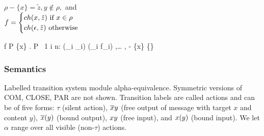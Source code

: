 \begin{minipage}{0.9\textwidth}
    {\judgement{}{}{\anullproc}}
    {}
    {\begin{varwidth}{6cm}
      $ \rho - \{x\} = \tilde{z}, y \notin \rho,$ and \\
      $ f =
        \begin{cases}
          ch(x, \tilde{z}) \text{ if } x \in \rho \\
          ch(\epsilon, \tilde{z}) \text{ otherwise }
        \end{cases} $
     \end{varwidth}}
    {\judgement
      {\rho}
      {f}
      {P}}
    {\judgement
      {\{x\} \cup {}}
      {}
      { . P}}
    {\forall\ 1 \leq i \leq n:
      }
    {\judgement
      {(\cup_i \rho_i)}
      {(\oplus_i f_i)}
      {
        {
        ,\ldots
        ,}}}
    {}
    {}
    {}
    {}
    {\judgement
      {\rho - \{x\}}
      {}
      {}}
    {\judgement
      {\{\}}
      {}
      {}}
\end{minipage}




\subsubsection{Semantics}

Labelled transition system module alpha-equivalence.
Symmetric versions of COM, CLOSE, PAR are not shown.
Transition labels are called actions and can be of five forms:
$\tau$ (silent action),
$\overline{x}y$ (free output of message with target $x$ and content $y$),
$\overline{x}(y)$ (bound output),
$xy$ (free input),
and $x(y)$ (bound input).
We let $\alpha$ range over all visible (non-$\tau$) actions.

